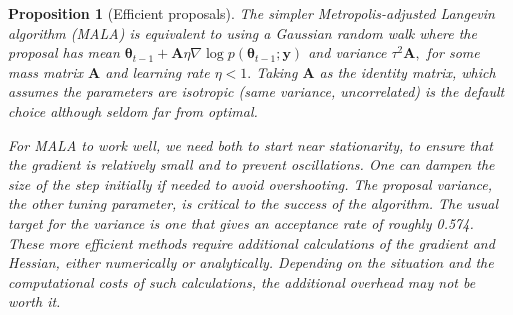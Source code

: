 \documentclass[
  11pt,
  letterpaper,
]{scrbook}
\theoremstyle{definition}
\theoremstyle{plain}
\newtheorem{proposition}{Proposition}[chapter]
\theoremstyle{plain}
\theoremstyle{plain}
\theoremstyle{definition}
\theoremstyle{definition}
\theoremstyle{plain}
\newtheorem{proposition}{Proposition}[chapter]
\theoremstyle{plain}
\theoremstyle{remark}
\begin{document}
\begin{proposition}[Efficient
proposals]
The simpler Metropolis-adjusted Langevin algorithm (MALA) is equivalent
to using a Gaussian random walk where the proposal has mean
\(\boldsymbol{\theta}_{t-1} + \mathbf{A}\eta \nabla \log p(\boldsymbol{\theta}_{t-1}; \boldsymbol{y})\)
and variance \(\tau^2\mathbf{A},\) for some mass matrix \(\mathbf{A}\)
and learning rate \(\eta < 1.\) Taking \(\mathbf{A}\) as the identity
matrix, which assumes the parameters are isotropic (same variance,
uncorrelated) is the default choice although seldom far from optimal.

For MALA to work well, we need both to start near stationarity, to
ensure that the gradient is relatively small and to prevent
oscillations. One can dampen the size of the step initially if needed to
avoid overshooting. The proposal variance, the other tuning parameter,
is critical to the success of the algorithm. The usual target for the
variance is one that gives an acceptance rate of roughly 0.574. These
more efficient methods require additional calculations of the gradient
and Hessian, either numerically or analytically. Depending on the
situation and the computational costs of such calculations, the
additional overhead may not be worth it.

\end{proposition}
\end{document}
